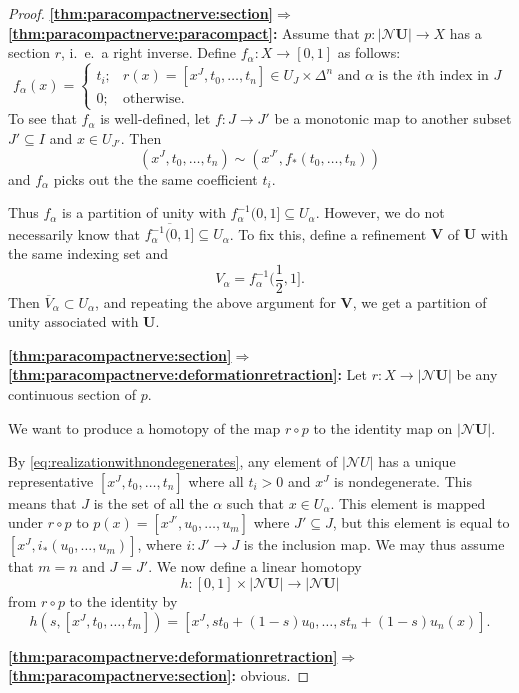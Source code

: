 \documentclass[a4paper,openany]{scrbook}
\newcommand{\nerve}{\mathcal N}
\begin{document}
\begin{proof}
\medskip
\noindent\textbf{\eqref{thm:paracompactnerve:section}$\Longrightarrow$\eqref{thm:paracompactnerve:paracompact}:}
Assume that $p\colon |\nerve \mathbf U| \to X$ has a section $r$, i.~e.\ a right inverse. Define $f_\alpha\colon X \to [0,1]$ as follows:
\[
f_\alpha(x) = \begin{cases} t_i; & r(x) = [x^J,t_0,\dots,t_n] \in U_J \times \Delta^n \text{ and $\alpha$ is the $i$th index in $J$}\\
0; & \text{otherwise.} 
\end{cases}
\]
To see that $f_\alpha$ is well-defined, let $f\colon J \to J'$ be a monotonic map to another subset $J' \subseteq I$ and $x \in U_{J'}$. Then
\[
(x^J,t_0,\dots,t_n) \sim (x^{J'},f_*(t_0,\dots,t_n))
\]
and $f_\alpha$ picks out the the same coefficient $t_i$.

Thus $f_\alpha$ is a partition of unity with $f_{\alpha}^{-1}(0,1] \subseteq U_\alpha$. However, we do not necessarily know that $\overline{f_{\alpha}^{-1}(0,1]} \subseteq U_\alpha$. To fix this, define a refinement $\mathbf V$ of $\mathbf U$ with the same indexing set and
\[
V_{\alpha} = f_{\alpha}^{-1}(\frac12,1].
\]
Then $\overline V_{\alpha} \subset U_\alpha$, and repeating the above argument for $\mathbf V$, we get a partition of unity associated with $\mathbf U$.

\medskip
\noindent\textbf{\eqref{thm:paracompactnerve:section}$\Longrightarrow$\eqref{thm:paracompactnerve:deformationretraction}:}
Let $r\colon X \to |\nerve \mathbf U|$ be any continuous section of $p$.

We want to produce a homotopy of the map $r \circ p$ to the identity map on $|\nerve\mathbf U|$. 

By \eqref{eq:realizationwithnondegenerates}, any element of $|\nerve U|$ has a unique representative $[x^J,t_0,\dots,t_n]$ where all $t_i>0$ and $x^J$ is nondegenerate. This means that $J$ is the set of all the $\alpha$ such that $x \in U_\alpha$. This element is mapped under $r \circ p$ to $p(x)=[x^{J'},u_0,\dots,u_m]$ where $J' \subseteq J$, but this element is equal to $[x^J,i_*(u_0,\dots,u_m)]$, where $i\colon J' \to J$ is the inclusion map. We may thus assume that $m=n$ and $J=J'$. We now define a linear homotopy
\[
h\colon [0,1] \times |\nerve \mathbf U| \to |\nerve \mathbf U|
\]
from $r\circ p$ to the identity by
\[
h(s,[x^J,t_0,\dots,t_m]) = [x^J,st_0+(1-s)u_0,\dots,st_n+(1-s)u_n(x)].
\]

\medskip\noindent\textbf{\eqref{thm:paracompactnerve:deformationretraction}$\Longrightarrow$\eqref{thm:paracompactnerve:section}:} obvious.
\end{proof}
\end{document}
